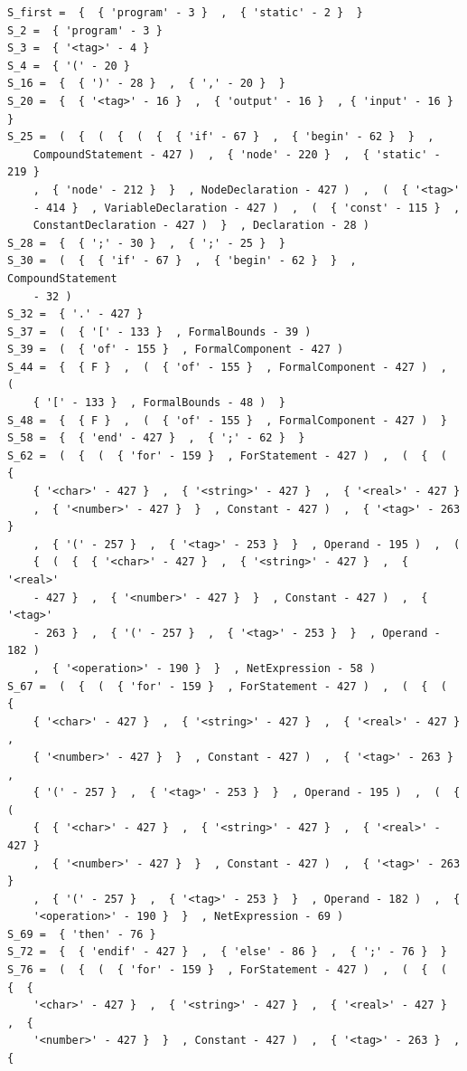 \documentclass[12pt]{article}
\begin{document}
\begin{verbatim}
S_first =  {  { 'program' - 3 }  ,  { 'static' - 2 }  } 
S_2 =  { 'program' - 3 } 
S_3 =  { '<tag>' - 4 } 
S_4 =  { '(' - 20 } 
S_16 =  {  { ')' - 28 }  ,  { ',' - 20 }  } 
S_20 =  {  { '<tag>' - 16 }  ,  { 'output' - 16 }  , { 'input' - 16 } } 
S_25 =  (  {  (  {  (  {  { 'if' - 67 }  ,  { 'begin' - 62 }  }  , 
    CompoundStatement - 427 )  ,  { 'node' - 220 }  ,  { 'static' - 219 }  
    ,  { 'node' - 212 }  }  , NodeDeclaration - 427 )  ,  (  { '<tag>' 
    - 414 }  , VariableDeclaration - 427 )  ,  (  { 'const' - 115 }  , 
    ConstantDeclaration - 427 )  }  , Declaration - 28 ) 
S_28 =  {  { ';' - 30 }  ,  { ';' - 25 }  } 
S_30 =  (  {  { 'if' - 67 }  ,  { 'begin' - 62 }  }  , CompoundStatement 
    - 32 ) 
S_32 =  { '.' - 427 } 
S_37 =  (  { '[' - 133 }  , FormalBounds - 39 ) 
S_39 =  (  { 'of' - 155 }  , FormalComponent - 427 ) 
S_44 =  {  { F }  ,  (  { 'of' - 155 }  , FormalComponent - 427 )  ,  (  
    { '[' - 133 }  , FormalBounds - 48 )  } 
S_48 =  {  { F }  ,  (  { 'of' - 155 }  , FormalComponent - 427 )  } 
S_58 =  {  { 'end' - 427 }  ,  { ';' - 62 }  } 
S_62 =  (  {  (  { 'for' - 159 }  , ForStatement - 427 )  ,  (  {  (  {  
    { '<char>' - 427 }  ,  { '<string>' - 427 }  ,  { '<real>' - 427 }  
    ,  { '<number>' - 427 }  }  , Constant - 427 )  ,  { '<tag>' - 263 }  
    ,  { '(' - 257 }  ,  { '<tag>' - 253 }  }  , Operand - 195 )  ,  (  
    {  (  {  { '<char>' - 427 }  ,  { '<string>' - 427 }  ,  { '<real>' 
    - 427 }  ,  { '<number>' - 427 }  }  , Constant - 427 )  ,  { '<tag>' 
    - 263 }  ,  { '(' - 257 }  ,  { '<tag>' - 253 }  }  , Operand - 182 )  
    ,  { '<operation>' - 190 }  }  , NetExpression - 58 ) 
S_67 =  (  {  (  { 'for' - 159 }  , ForStatement - 427 )  ,  (  {  (  {  
    { '<char>' - 427 }  ,  { '<string>' - 427 }  ,  { '<real>' - 427 }  ,  
    { '<number>' - 427 }  }  , Constant - 427 )  ,  { '<tag>' - 263 }  ,  
    { '(' - 257 }  ,  { '<tag>' - 253 }  }  , Operand - 195 )  ,  (  {  (  
    {  { '<char>' - 427 }  ,  { '<string>' - 427 }  ,  { '<real>' - 427 }  
    ,  { '<number>' - 427 }  }  , Constant - 427 )  ,  { '<tag>' - 263 }  
    ,  { '(' - 257 }  ,  { '<tag>' - 253 }  }  , Operand - 182 )  ,  { 
    '<operation>' - 190 }  }  , NetExpression - 69 ) 
S_69 =  { 'then' - 76 } 
S_72 =  {  { 'endif' - 427 }  ,  { 'else' - 86 }  ,  { ';' - 76 }  } 
S_76 =  (  {  (  { 'for' - 159 }  , ForStatement - 427 )  ,  (  {  (  {  { 
    '<char>' - 427 }  ,  { '<string>' - 427 }  ,  { '<real>' - 427 }  ,  { 
    '<number>' - 427 }  }  , Constant - 427 )  ,  { '<tag>' - 263 }  ,  { 

\end{verbatim}
\end{document}

